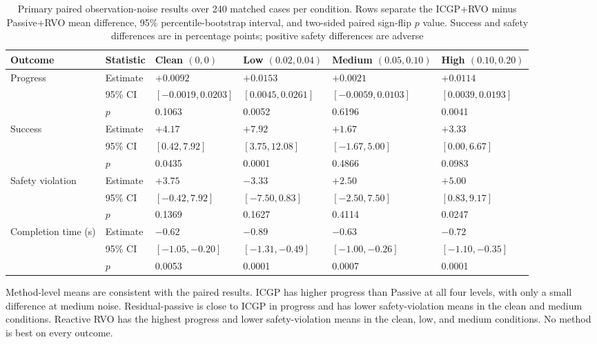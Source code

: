\documentclass[pdflatex,sn-mathphys-num]{sn-jnl}
\begin{document}
\begin{table}[htbp]
\caption{Primary paired observation-noise results over 240 matched cases per condition. Rows separate the ICGP+RVO minus Passive+RVO mean difference, 95\% percentile-bootstrap interval, and two-sided paired sign-flip $p$ value. Success and safety differences are in percentage points; positive safety differences are adverse}
\label{tab:noise}
\centering
\scriptsize
\setlength{\tabcolsep}{3pt}
\renewcommand{\arraystretch}{0.96}
\begin{tabular}{@{}p{}p{}p{}p{}p{}p{}@{}}
\toprule
Outcome & Statistic & Clean $(0,0)$ & Low $(0.02,0.04)$ & Medium $(0.05,0.10)$ & High $(0.10,0.20)$ \\
\midrule
Progress & Estimate & $+0.0092$ & $+0.0153$ & $+0.0021$ & $+0.0114$ \\
 & 95\% CI & $[-0.0019,\allowbreak 0.0203]$ & $[0.0045,\allowbreak 0.0261]$ & $[-0.0059,\allowbreak 0.0103]$ & $[0.0039,\allowbreak 0.0193]$ \\
 & $p$ & 0.1063 & 0.0052 & 0.6196 & 0.0041 \\
\addlinespace[2pt]
Success & Estimate & $+4.17$ & $+7.92$ & $+1.67$ & $+3.33$ \\
 & 95\% CI & $[0.42,\allowbreak 7.92]$ & $[3.75,\allowbreak 12.08]$ & $[-1.67,\allowbreak 5.00]$ & $[0.00,\allowbreak 6.67]$ \\
 & $p$ & 0.0435 & 0.0001 & 0.4866 & 0.0983 \\
\addlinespace[2pt]
Safety violation & Estimate & $+3.75$ & $-3.33$ & $+2.50$ & $+5.00$ \\
 & 95\% CI & $[-0.42,\allowbreak 7.92]$ & $[-7.50,\allowbreak 0.83]$ & $[-2.50,\allowbreak 7.50]$ & $[0.83,\allowbreak 9.17]$ \\
 & $p$ & 0.1369 & 0.1627 & 0.4114 & 0.0247 \\
\addlinespace[2pt]
Completion time (s) & Estimate & $-0.62$ & $-0.89$ & $-0.63$ & $-0.72$ \\
 & 95\% CI & $[-1.05,\allowbreak -0.20]$ & $[-1.31,\allowbreak -0.49]$ & $[-1.00,\allowbreak -0.26]$ & $[-1.10,\allowbreak -0.35]$ \\
 & $p$ & 0.0053 & 0.0001 & 0.0007 & 0.0001 \\
\bottomrule
\end{tabular}
\end{table}

Method-level means are consistent with the paired results. ICGP has higher progress than Passive at all four levels, with only a small difference at medium noise. Residual-passive is close to ICGP in progress and has lower safety-violation means in the clean and medium conditions. Reactive RVO has the highest progress and lower safety-violation means in the clean, low, and medium conditions. No method is best on every outcome.
\end{document}
